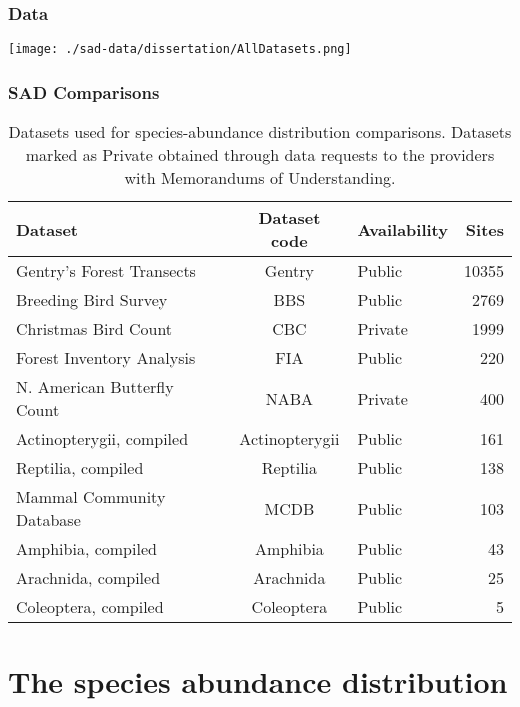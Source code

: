 \documentclass[14pt]{beamer}
\begin{document}
\begin{frame}{}
\frametitle{Data}
\texttt{[image: ./sad-data/dissertation/AllDatasets.png]}
\end{frame}

\begin{frame}[shrink=35]
\frametitle{SAD Comparisons}
\begin{center}
\begin{table}
\begin{tabular}{l|c|l|r}
 Dataset &Dataset code &Availability &Sites\\
\hline
 Gentry's Forest Transects &Gentry &Public &10355\\
 Breeding Bird Survey &BBS &Public &2769\\
 Christmas Bird Count &CBC &Private &1999\\
 Forest Inventory Analysis &FIA	 &Public &220\\
 N. American Butterfly Count &NABA &Private &400\\
 Actinopterygii, compiled &Actinopterygii &Public &161\\
 Reptilia, compiled &Reptilia &Public &138\\
 Mammal Community Database &MCDB &Public &103\\
 Amphibia, compiled &Amphibia &Public &43\\
 Arachnida, compiled &Arachnida &Public &25\\
 Coleoptera, compiled &Coleoptera &Public &5\\
\end{tabular}
\caption{Datasets used for species-abundance distribution comparisons. Datasets marked as Private obtained through data requests to the providers with Memorandums of Understanding.}
\end{table}
\end{center}
\end{frame}

\section{The species abundance distribution}
\end{document}
